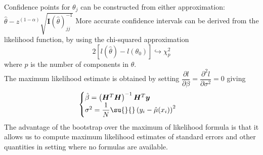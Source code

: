 Confidence points for $\theta_{j}$ can be constructed from either approximation:
$\hat{\theta}-z^{(1-\alpha)}\sqrt{\bm{I}(\hat{\theta})_{jj}^{-1}}$
More accurate confidence intervals can be derived from the likelihood function, by using the
chi-squared approximation
$$ 2\left[l(\hat{\theta})-l(\theta_{0})\right]\hookrightarrow \chi_{p}^{2}$$
where $p$ is the number of components in $\theta$.\\
The maximum likelihood estimate is obtained by setting $\dfrac{\partial l}{\partial\beta}=
\dfrac{\partial^{2} l}{\partial\sigma^{2}}=0$ giving 
$$
\begin{cases}
	\hat{\beta} = \left(\bm{H}^{T}\bm{H}\right)^{-1}\bm{H}^{T}\bm{y}\\
	\sigma^{2} = \dfrac{1}{N}\su{}{}\left(y_{i}-\hat{\mu}(x_{i})\right)^{2}
\end{cases}
$$
The advantage of the bootstrap over the maximum of likelihood formula is that it allows us to
compute maximum likelihood estimates of standard errors and other quantities in setting where
no formulas are available.


